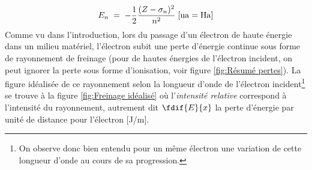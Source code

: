 \begin{equation}
    E_n \eq -\dfrac{1}{2} \dfrac{(Z-\sigma_n)^2}{n^2} \; [\si{ua} = \si{Ha}]
    \label{eq:energie_effective}
\end{equation}
Comme vu dans l'introduction, lors du passage d'un électron de haute énergie dans un milieu matériel, l'électron subit une perte d'énergie continue sous forme de rayonnement de freinage (pour de hautes énergies de l'électron incident, on peut ignorer la perte sous forme d'ionisation, voir figure \ref{fig:Résumé pertes}). La figure idéalisée de ce rayonnement selon la longueur d'onde de l'électron incident\footnote{On observe donc bien entendu pour un même électron une variation de cette longueur d'onde au cours de sa progression.} se trouve à la figure \ref{fig:Freinage idéalisé} où l'\textit{intensité relative} correspond à l'intensité du rayonnement, autrement dit $\fdif{E}{x}$ la perte d'énergie par unité de distance pour l'électron [\si{J/m}].

